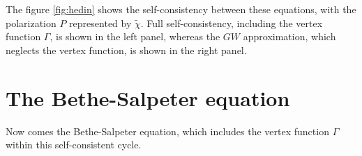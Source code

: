 \documentclass[12pt]{article}
\begin{document}
The figure \ref{fig:hedin} shows the self-consistency between these equations, with the polarization $P$ represented by $\tilde{\chi}$. Full self-consistency, including the vertex function $\Gamma$, is shown in the left panel, whereas the $GW$ approximation, which neglects the vertex function, is shown in the right panel.
\section{The Bethe-Salpeter equation}
Now comes the Bethe-Salpeter equation, which includes the vertex function $\Gamma$ within this self-consistent cycle.
\end{document}
